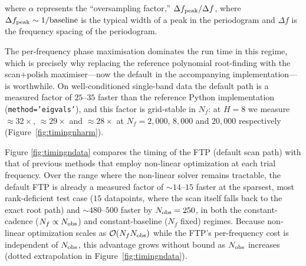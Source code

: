 \documentclass[apj]{emulateapj}
\newcommand{\bigO}{\mathcal{O}}
\begin{document}
\noindent where $\alpha$ represents the ``oversampling factor,'' $\Delta f_{\rm peak} / \Delta f$, where $\Delta f_{\rm peak} \sim 1/{\rm baseline}$ is
the typical width of a peak in the periodogram and $\Delta f$ is the frequency spacing of the periodogram.

The per-frequency phase maximisation dominates the run time in this regime, which is precisely why replacing the
reference polynomial root-finding with the scan+polish maximiser---now the default in the accompanying
implementation---is worthwhile. On well-conditioned single-band data the default path is a measured factor of
$25$--$35$ faster than the reference Python implementation (\texttt{method='eigvals'}), and this factor is
grid-stable in $N_f$: at $H=8$ we measure ${\approx}32\times$, ${\approx}29\times$ and ${\approx}28\times$ at $N_f=2{,}000$, $8{,}000$ and
$20{,}000$ respectively (Figure~\ref{fig:timingnharm}).

Figure \ref{fig:timingndata} compares the timing of the FTP (default scan path) with that of previous methods that
employ non-linear optimization at each trial frequency. Over the range where the non-linear solver remains tractable,
the default FTP is already a measured factor of ${\sim}14$--$15$ faster at the sparsest, most rank-deficient test case
($15$ datapoints, where the scan itself falls back to the exact root path) and ${\sim}480$--$500$ faster by
$N_{\rm obs}=250$, in both the constant-cadence ($N_f\propto N_{\rm obs}$) and constant-baseline ($N_f$ fixed)
regimes. Because non-linear optimization scales as $\bigO(N_f N_{\rm obs})$ while the FTP's per-frequency cost is
independent of $N_{\rm obs}$, this advantage grows without bound as $N_{\rm obs}$ increases (dotted extrapolation in
Figure~\ref{fig:timingndata}).


%

%
\end{document}
